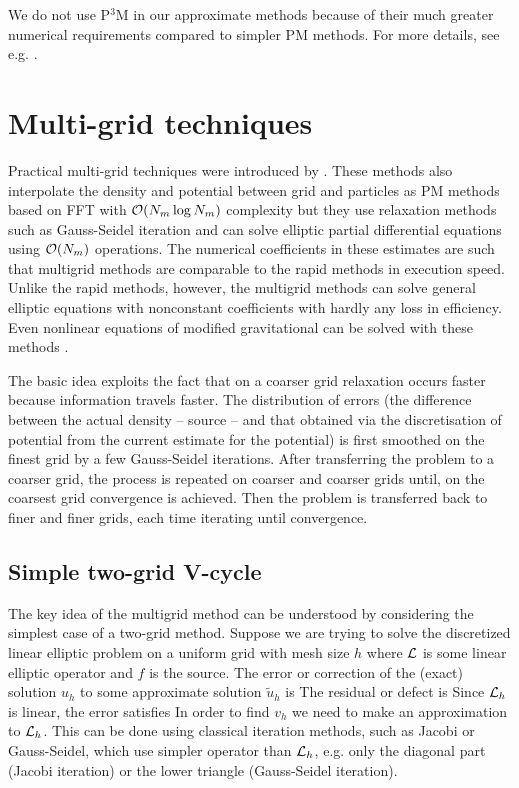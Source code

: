 We do not use P$^3$M in our approximate methods because of their much greater numerical requirements compared to simpler PM methods. For more details, see e.g. \textcite{Hockney:1988:CSU:62815}.
\section{Multi-grid techniques}
Practical multi-grid techniques were introduced by \textcite{10.2307/2006422}. These methods also interpolate the density and potential between grid and particles as PM methods based on FFT with $\mathcal{O}(N_m\log N_m)$ complexity but they use relaxation methods such as Gauss-Seidel iteration \parencite{doi:10.1002/zamm.19720520813} and can solve elliptic partial differential equations using $\mathcal{O}(N_m)$ operations. The numerical coefficients in these estimates are such that multigrid methods are comparable to the rapid methods in execution speed. Unlike the rapid methods, however, the multigrid methods can solve general elliptic equations with nonconstant coefficients with hardly any loss in efficiency. Even nonlinear equations of modified gravitational can be solved with these methods \parencite{10.5555/42249}.

The basic idea exploits the fact that on a coarser grid relaxation occurs faster because information travels faster. The distribution of errors (the difference between the actual density -- source -- and that obtained via the discretisation of potential from the current estimate for the potential) is first smoothed on the finest grid by a few Gauss-Seidel iterations. After transferring the problem to a coarser grid, the process is repeated on coarser and coarser grids until, on the coarsest grid convergence is achieved. Then the problem is transferred back to finer and finer grids, each time iterating until convergence.
\subsection{Simple two-grid V-cycle}
The key idea of the multigrid method can be understood by considering the simplest case of a two-grid method. Suppose we are trying to solve the discretized linear elliptic problem on a uniform grid with mesh size $h$
where $\mathcal{L}$ is some linear elliptic operator and $f$ is the source. The error or correction of the (exact) solution $u_h$ to some approximate solution $\tilde u_h$ is
The residual or defect is
Since $\mathcal{L}_h$ is linear, the error satisfies
In order to find $v_h$ we need to make an approximation to $\mathcal{L}_h$. This can be done using classical iteration methods, such as Jacobi or Gauss-Seidel, which use simpler operator than $\mathcal{L}_h$, e.g. only the diagonal part (Jacobi iteration) or the lower triangle (Gauss-Seidel iteration).

